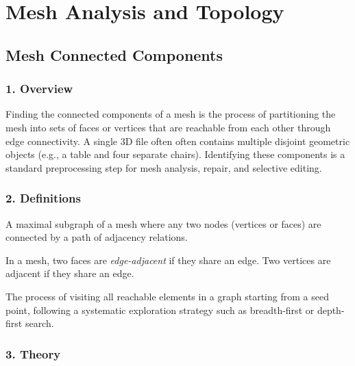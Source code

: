 \chapter{Mesh Analysis and Topology}
\label{ch:mesh_analysis}

\section{Mesh Connected Components}
\label{sec:mesh_connected_components}

\subsection{1. Overview}

Finding the  connected components of a mesh is the process of partitioning the mesh into sets of faces or vertices that are reachable from each other through edge connectivity. A single 3D file often often contains multiple disjoint geometric objects (e.g., a table and four separate chairs). Identifying these components is a standard preprocessing step for mesh analysis\cite{botsch2010}, repair, and selective editing.

\subsection{2. Definitions}

\begin{definition}\label{def:connected_component}
A maximal subgraph of a mesh where any two nodes (vertices or faces) are connected by a path of adjacency relations.
\end{definition}

\begin{definition}[Adjacency]\label{def:mesh_adjacency}
In a mesh, two faces are \emph{edge-adjacent} if they share an edge. Two vertices are adjacent if they share an edge.
\end{definition}

\begin{definition}\label{def:graph_traversal}
The process of visiting all reachable elements in a graph starting from a seed point, following a systematic exploration strategy such as breadth-first or depth-first search.
\end{definition}

\subsection{3. Theory}


